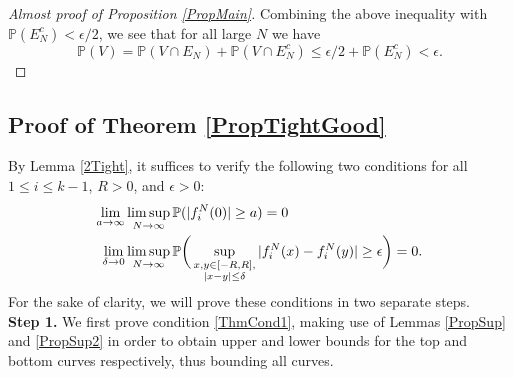 \begin{proof}[Almost proof of Proposition \ref{PropMain}]
	Combining the above inequality with $\mathbb{P}(E_N^c) <  \epsilon/2$, we see that for all large $N$ we have
	$$\mathbb{P}\left( V  \right) = \mathbb{P}(V \cap E_N) + \mathbb{P}(V \cap E_N^c) \leq \epsilon/2 + \mathbb{P}(E_N^c) < \epsilon.$$
\end{proof}


%
\subsection{Proof of Theorem \ref{PropTightGood} }\label{Section4.2}
	
		By Lemma \ref{2Tight}, it suffices to verify the following two conditions for all $1\leq i\leq k-1$, $R>0$, and $\epsilon>0$:
	\begin{align}
	\lim_{a\to\infty} &\limsup_{N\to\infty} \mathbb{P}(|f^N_i(0)|\geq a) = 0 \label{ThmCond1}\\
	\lim_{\delta\to 0} &\limsup_{N\to\infty} \mathbb{P}\bigg(\sup_{\substack{x,y\in [-R,R], \\ |x-y|\leq\delta}} |f^N_i(x) - f^N_i(y)| \geq \epsilon\bigg)= 0. \label{ThmCond2}
	\end{align}
	For the sake of clarity, we will prove these conditions in two separate steps.\\
	
	\noindent\textbf{Step 1.} We first prove condition \eqref{ThmCond1}, making use of Lemmas \ref{PropSup} and \ref{PropSup2} in order to obtain upper and lower bounds for the top and bottom curves respectively, thus bounding all curves.
	

